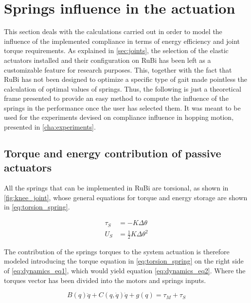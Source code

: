 
\section{Springs influence in the actuation}
\label{sec_springs}
This section deals with the calculations carried out in order to model the influence of the implemented compliance in terms of energy efficiency and joint torque requirements.
As explained in \ref{sec:joints}, the selection of the elastic actuators installed and their configuration on RuBi has been left as a customizable feature for research purposes.
This, together with the fact that RuBi has not been designed to optimize a specific type of gait made pointless the calculation of optimal values of springs.
Thus, the following is just a theoretical frame presented to provide an easy method to compute the influence of the springs in the performance once the user has selected them.
It was meant to be used for the experiments devised on compliance influence in hopping motion, presented in \ref{cha:experiments}.

\subsection{Torque and energy contribution of passive actuators} %
\label{sub:torque_contribution_of_passive_actuators}
All the springs that can be implemented in RuBi are torsional, as shown in \ref{fig:knee_joint}, whose general equations for torque and energy storage are shown in \ref{eq:torsion_spring}. 

\begin{equation}
\label{eq:torsion_spring}
\begin{aligned}
	\tau_{S} &= -K \Delta \theta \\
	U_{S} &= \frac{1}{2}K \Delta \theta^2
\end{aligned}
\end{equation}

The contribution of the springs torques to the system actuation is therefore modeled introducing the torque equation in \ref{eq:torsion_spring} on the right side of \ref{eq:dynamics_eq1}, which would yield equation \ref{eq:dynamics_eq2}.
Where the torques vector has been divided into the motors and springs inputs.

\begin{equation}
	\label{eq:dynamics_eq2}
	B(q)\ddot{q} + C(q,\dot{q})\dot{q} + g(q) = \tau_{M} + \tau_{S}
\end{equation}

